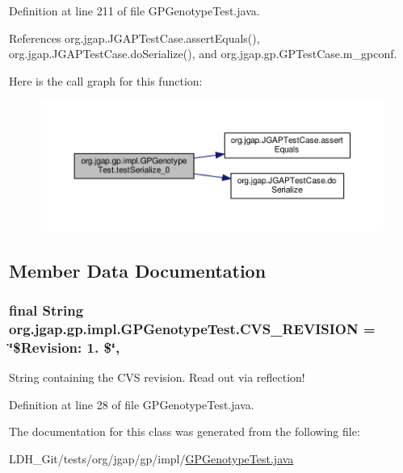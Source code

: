 Definition at line 211 of file G\-P\-Genotype\-Test.\-java.



References org.\-jgap.\-J\-G\-A\-P\-Test\-Case.\-assert\-Equals(), org.\-jgap.\-J\-G\-A\-P\-Test\-Case.\-do\-Serialize(), and org.\-jgap.\-gp.\-G\-P\-Test\-Case.\-m\-\_\-gpconf.



Here is the call graph for this function\-:
\nopagebreak
\begin{figure}[H]
\begin{center}
\leavevmode
\includegraphics[width=350pt]{classorg_1_1jgap_1_1gp_1_1impl_1_1_g_p_genotype_test_a19ca50bfa7c533479a7838cf5c64a44e_cgraph}
\end{center}
\end{figure}




\subsection{Member Data Documentation}
\hypertarget{classorg_1_1jgap_1_1gp_1_1impl_1_1_g_p_genotype_test_a2c7d789bab34cf450ef8c9218d6e3f93}{
\subsubsection[{C\-V\-S\-\_\-\-R\-E\-V\-I\-S\-I\-O\-N}]{\setlength{\rightskip}{0pt plus 5cm}final String org.\-jgap.\-gp.\-impl.\-G\-P\-Genotype\-Test.\-C\-V\-S\-\_\-\-R\-E\-V\-I\-S\-I\-O\-N = \char`\"{}\$Revision\-: 1. \$\char`\"{}\hspace{0.3cm}{\ttfamily [static]}, {\ttfamily [private]}}}\label{classorg_1_1jgap_1_1gp_1_1impl_1_1_g_p_genotype_test_a2c7d789bab34cf450ef8c9218d6e3f93}
String containing the C\-V\-S revision. Read out via reflection! 

Definition at line 28 of file G\-P\-Genotype\-Test.\-java.



The documentation for this class was generated from the following file\-:\begin{DoxyCompactItemize}
\item 
L\-D\-H\-\_\-\-Git/tests/org/jgap/gp/impl/\hyperlink{_g_p_genotype_test_8java}{G\-P\-Genotype\-Test.\-java}\end{DoxyCompactItemize}
